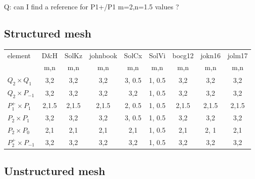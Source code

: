 Q: can I find a reference for P1+/P1 m=2,n=1.5 values ?

\subsection*{Structured mesh}

\begin{scriptsize}
\begin{center}
\begin{tabular}{|l|c|c|c|c|c|c|c|c|}
\hline
element & 
D\&H  & 
SolKz &  
johnbook  & 
SolCx &  
SolVi & 
bocg12& 
jokn16 & 
jolm17 \\
& 
m,n& 
m,n& 
m,n& 
m,n& 
m,n& 
m,n&
m,n&
m,n\\
\hline
$Q_2\times Q_1$       & 
{\color{teal} 3,2}     & 
{\color{teal} 3,2}      & 
{\color{teal} 3,2}    & 
3, 0.5   & 
1, 0.5 & 
{\color{teal} 3,2}  & 
{\color{teal} 3,2}  &
{\color{teal} 3,2} \\ 
$Q_2\times P_{-1}$    & 
{\color{teal}3,2}   & 
{\color{teal}3,2}     & 
{\color{teal}3,2}    & 
{\color{teal}3,2}     & 
1, 0.5 & 
{\color{teal}3,2}   & 
{\color{teal}3,2}    &
{\color{teal}3,2}  \\ 
$P_1^+\times P_{1}$   & 
{\color{teal} 2,1.5}  & 
{\color{teal} 2,1.5}  & 
{\color{teal} 2,1.5}  & 
2, 0.5 & 
1, 0.5 & 
{\color{teal} 2,1.5}  & 
{\color{teal} 2,1.5}  & 
{\color{teal} 2,1.5}  \\ 
$P_2\times P_1$       & 
{\color{teal}3,2}   & 
{\color{teal}3,2}   & 
{\color{teal}3,2}   & 
3, 0.5   & 
1, 0.5 & 
{\color{teal}3,2}   & 
{\color{teal}3,2}   & 
{\color{teal}3,2}   \\ 
$P_2\times P_0$       & 
{\color{teal}2,1}   & 
{\color{teal}2,1}   & 
{\color{teal}2,1}   & 
{\color{teal}2,1}   & 
1, 0.5 & 
{\color{teal}2,1}   & 
2, 1 & 
{\color{teal}2,1}   \\ 
$P_2^+\times P_{-1}$  & 
{\color{teal}3,2}     & 
{\color{teal}3,2}     & 
{\color{teal}3,2}     & 
{\color{teal}3,2}     & 
1, 0.5 & 
{\color{teal}3,2}     & 
{\color{teal}3,2}     & 
{\color{teal}3,2}     \\ 
\hline
\end{tabular}
\end{center}
\end{scriptsize}

\subsection*{Unstructured mesh}


